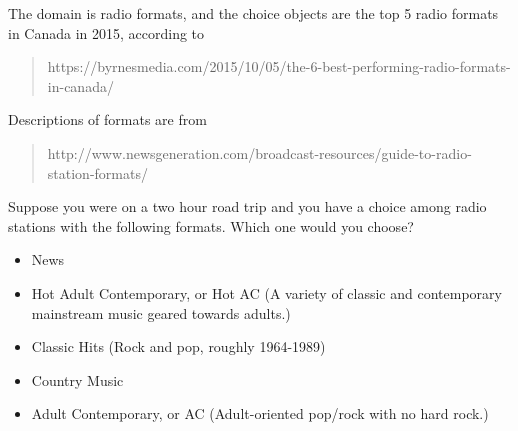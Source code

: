 
The domain is radio formats, and the choice objects are the top 5 radio formats in Canada in 2015, according to
\begin{quotation}
	https://byrnesmedia.com/2015/10/05/the-6-best-performing-radio-formats-in-canada/
\end{quotation}
Descriptions of formats are from
\begin{quotation}
	http://www.newsgeneration.com/broadcast-resources/guide-to-radio-station-formats/
\end{quotation}

\begin{tcolorbox}
Suppose you were on a two hour road trip and you have a choice among radio stations with the following formats.
Which one would you choose?

\begin{itemize}
	\setlength\itemsep{-5pt}
	\item News
	\item Hot Adult Contemporary, or Hot AC
	(A variety of classic and contemporary mainstream music geared towards adults.)
	\item Classic Hits (Rock and pop, roughly 1964-1989)
	\item Country Music
	\item Adult Contemporary, or AC (Adult-oriented pop/rock with no hard rock.)
\end{itemize}
\end{tcolorbox}
